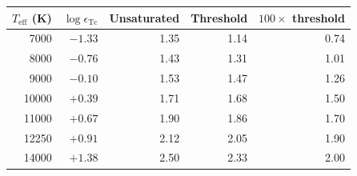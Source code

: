 \begin{tabular}{rrrrr}
\toprule
$T_\mathrm{eff}$ (K) & $\log\epsilon_\mathrm{Tc}$ & Unsaturated & Threshold & $100\times$ threshold \\
\midrule
7000 & $-1.33$ & 1.35 & 1.14 & 0.74 \\
8000 & $-0.76$ & 1.43 & 1.31 & 1.01 \\
9000 & $-0.10$ & 1.53 & 1.47 & 1.26 \\
10000 & $+0.39$ & 1.71 & 1.68 & 1.50 \\
11000 & $+0.67$ & 1.90 & 1.86 & 1.70 \\
12250 & $+0.91$ & 2.12 & 2.05 & 1.90 \\
14000 & $+1.38$ & 2.50 & 2.33 & 2.00 \\
\bottomrule
\end{tabular}
